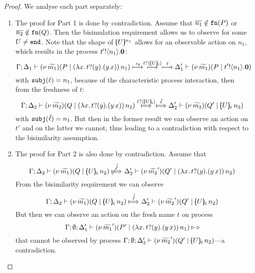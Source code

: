 \begin{proof}
We analyse each part separately:
	\begin{enumerate}[1.]
		\item	The proof for Part 1 is done by contradiction.
				Assume that $\overline{n_1} \notin \mathtt{fn}(P)$ or $\overline{n_2} \notin \mathtt{fn}(Q)$.
				Then the bisimulation requirement allows us to observe for some $U \not= \mathtt{end}$.
				Note that the shape of $[\!\!(U)\!\!]^{n_1}$ allows for an observable action on $n_1$, which 
				results in the process $t' ! \langle n_1 \rangle . \mathbf{0}$:
				\[
					\Gamma; \Delta_1 \vdash (\nu\, \widetilde{m_1})(P \;|\; (\lambda x.\,t ? (y) . (y\, {x}))\, {n_1} )  \stackrel{\tau_{\mathsf{d}}}{\longmapsto} \stackrel{ t ? \langle [\!\!(U)\!\!]_{\mathsf{c}} \rangle  }{\longmapsto} \stackrel{\ell}{\longmapsto}  \Delta_1' \vdash (\nu\, \widetilde{m_1})(P \;|\; t' ! \langle n_1 \rangle . \mathbf{0} )
				\]
				with $\mathtt{subj}(\ell) = n_1$, because of the characteristic process interaction,
				then from the freshness of $t$:
				\[
					\horel{\Gamma}{\Delta_2}{\newsp{\widetilde{m_2}}{Q \Par \appl{(\trvalx{t})}{n_2} }}
					{ \Hby{ \bactinp{t}{\omapchar{U}}  } \Hby{\mact{\ell}} }
					{\Delta_2'}{\newsp{\widetilde{m_2}}{Q' \Par \appl{\omapchar{U}}{n_2}}}
				\]
				with $\mathtt{subj}(\breve{\ell}) = n_1$. %
				But then in the former result we can observe an action on $t'$ and on the latter
				we cannot, thus leading to a contradiction with respect to the bisimilarity assumption.

		\item	The proof for Part 2 is also done by contradiction. Assume that
				\[
					\horel{\Gamma}{\Delta_2}{\newsp{\widetilde{m_1}}{Q \Par \appl{\omapchar{U}}{n_2} }} %
					{\not\Hby{\hat{\mact{\ell}}}}
					{\Delta_2'}{\newsp{\widetilde{m_2}'}{Q' \Par \appl{(\trvalx{t})}{n_2} }} %
				\]
				From the bisimilarity requirement we can observe
				\[
					\horel{\Gamma}{\Delta_2}{\newsp{\widetilde{m_1}}{Q \Par \appl{\omapchar{U}}{n_2} }} %
					{\Hby{\hat{\mact{\ell}}}}
					{\Delta_2'}{\newsp{\widetilde{m_2}'}{Q' \Par \appl{\omapchar{U}}{n_2} }} %
				\]
				But then we can observe an action on the fresh name $t$ on process
				\[
					\Gamma; \emptyset; \Delta_1' \vdash (\nu\, \widetilde{m_1}')(P' \;|\; (\lambda x.\,t ? (y) . (y\, {x}))\, {n_1} ) \triangleright \diamond
				\]
				that cannot be observed by process
				$
					\Gamma; \emptyset; \Delta_2' \vdash (\nu\, \widetilde{m_2}')(Q' \;|\; [\!\!(U)\!\!]_{\mathsf{c}}\, {n_2} )
				$---a contradiction.


\end{enumerate}
\end{proof}
